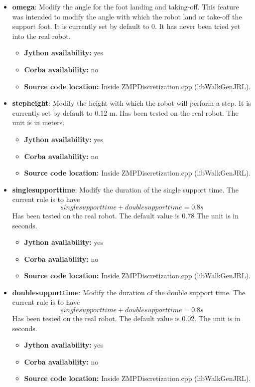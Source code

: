 \begin{itemize}
\item {\bf omega}: Modify the angle for the foot landing and taking-off. This feature was intended to modify
the angle with which the robot land or take-off the support foot. It is currently set by default to 0.
It has never been tried yet into the real robot.
\begin{itemize}
\item \textbf{Jython availability:} yes
\item \textbf{Corba availability:} no
\item \textbf{Source code location:} Inside ZMPDiscretization.cpp (libWalkGenJRL).
\end{itemize}


\item {\bf stepheight}: Modify the height with which the robot will perform a step.  
It is currently set by default to 0.12 m. Has been tested on the real robot.
The unit is in meters.
\begin{itemize}
\item \textbf{Jython availability:} yes
\item \textbf{Corba availability:} no
\item \textbf{Source code location:} Inside ZMPDiscretization.cpp (libWalkGenJRL).
\end{itemize}

\item {\bf singlesupporttime}: Modify the duration of the single support time. 
The current rule is to have 
\begin{equation}
singlesupporttime+doublesupporttime=0.8 s
\end{equation}
Has been tested on the real robot. The default value is 0.78
The unit is in seconds.
\begin{itemize}
\item \textbf{Jython availability:} yes
\item \textbf{Corba availability:} no
\item \textbf{Source code location:} Inside ZMPDiscretization.cpp (libWalkGenJRL).
\end{itemize}

\item {\bf doublesupporttime}: Modify the duration of the double support time. 
The current rule is to have 
\begin{equation}
singlesupporttime+doublesupporttime=0.8 s
\end{equation}
Has been tested on the real robot.
 The default value is 0.02. The unit is in seconds.
\begin{itemize}
\item \textbf{Jython availability:} yes
\item \textbf{Corba availability:} no
\item \textbf{Source code location:} Inside ZMPDiscretization.cpp (libWalkGenJRL).
\end{itemize}

\end{itemize}

